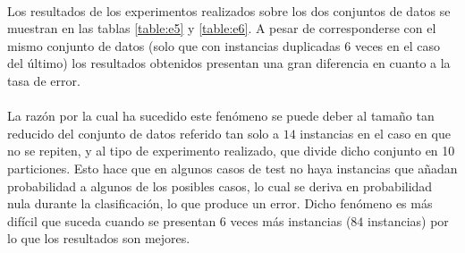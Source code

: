 \documentclass{article}
\begin{document}
			\paragraph{}
			Los resultados de los experimentos realizados sobre los dos conjuntos de datos se muestran en las tablas \ref{table:e5} y \ref{table:e6}. A pesar de corresponderse con el mismo conjunto de datos (solo que con instancias duplicadas 6 veces en el caso del último) los resultados obtenidos presentan una gran diferencia en cuanto a la tasa de error.

			\paragraph{}
			La razón por la cual ha sucedido este fenómeno se puede deber al tamaño tan reducido del conjunto de datos referido tan solo a $14$ instancias en el caso en que no se repiten, y al tipo de experimento realizado, que divide dicho conjunto en 10 particiones. Esto hace que en algunos casos de test no haya instancias que añadan probabilidad a algunos de los posibles casos, lo cual se deriva en probabilidad nula durante la clasificación, lo que produce un error. Dicho fenómeno es más difícil que suceda cuando se presentan 6 veces más instancias ($84$ instancias) por lo que los resultados son mejores.


	\nocite{garciparedes:machine-learning-bayesian-1}
	\nocite{subject:taa}
	\nocite{tool:weka}
  
  
\end{document}
